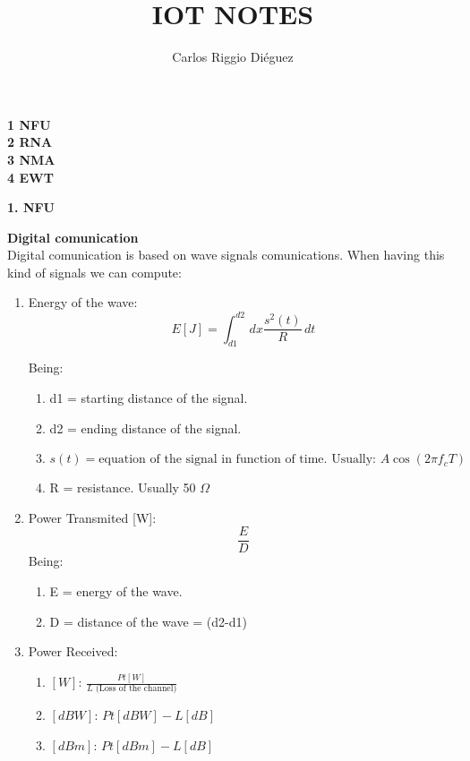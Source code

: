 \documentclass{article}
\title{IOT NOTES}
\author{Carlos Riggio Diéguez}
\theoremstyle{mytheoremstyle}
\theoremstyle{mytheoremstyle}
\theoremstyle{myproblemstyle}
\begin{document}
    \maketitle


    \begin{center}
        \textbf{1 NFU}\\
        \textbf{2 RNA}\\
        \textbf{3 NMA}\\
        \textbf{4 EWT}\\
    \end{center}

    \newpage
    \begin{center}
        \Huge\textbf{1. NFU}
      \end{center}

    \textbf{Digital comunication}
    \\

    Digital comunication is based on wave signals comunications. When having this kind of signals we can compute:
    \begin{enumerate}
        \item Energy of the wave:
            \[
            E[J] = \int_{d1}^{d2}  \,dx  \frac{s^2(t)}{R} \, dt
            \]
        
        Being: 
        \begin{enumerate}[label=\textbullet]
            \item d1 = starting distance of the signal.
            \item d2 = ending distance of the signal.
            \item $s(t) = \text{equation of the signal in function of time. Usually: } A\cos(2\pi f_c T)$
            \item R = resistance. Usually 50 $\Omega$
          \end{enumerate}
          

        \item Power Transmited [W]:
            \[\frac{E}{D} \]
            Being: 
            \begin{enumerate}[label=\textbullet]
                \item E = energy of the wave.
                \item D = distance of the wave = (d2-d1)
              \end{enumerate}

        \item Power Received:
        \begin{enumerate}[label=\textbullet]
            \item $[W]$:    $\frac{Pt[W]}{L \text{ (Loss of the channel)}}$
            \item $[dBW]$:  $Pt[dBW] - L[dB]$
            \item $[dBm]$:  $Pt[dBm] - L[dB]$
          \end{enumerate}
          
      \end{enumerate}
\end{document}
